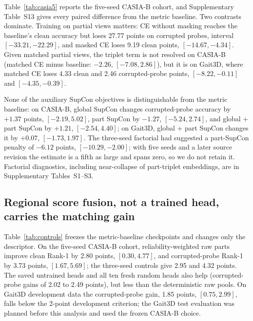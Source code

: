 \documentclass[journal]{IEEEtran}
\newcommand{\tablesetup}{\footnotesize\setlength{\tabcolsep}{4pt}}
\begin{document}
Table~\ref{tab:casia5} reports the five-seed CASIA-B cohort, and
Supplementary Table~S13 gives every paired difference from the metric baseline. Two
contrasts dominate. Training on partial views matters: CE without masking
reaches the baseline's clean accuracy but loses 27.77 points on corrupted
probes, interval $[-33.21,-22.29]$, and masked CE loses 9.19 clean points,
$[-14.67,-4.34]$. Given matched partial views, the triplet term is not
resolved on CASIA-B (matched CE minus baseline: $-2.26$, $[-7.08,2.86]$), but it
is on Gait3D, where matched CE loses 4.33 clean and 2.46 corrupted-probe points,
$[-8.22,-0.11]$ and $[-4.35,-0.39]$.

None of the auxiliary SupCon objectives is distinguishable from the metric
baseline: on CASIA-B, global SupCon changes corrupted-probe accuracy by $+1.37$
points, $[-2.19,5.02]$, part SupCon by $-1.27$, $[-5.24,2.74]$, and global + part
SupCon by $+1.21$, $[-2.54,4.40]$; on Gait3D, global + part SupCon changes it by
$+0.07$, $[-1.73,1.97]$. The three-seed factorial had suggested a part-SupCon
penalty of $-6.12$ points, $[-10.29,-2.00]$; with five seeds and a later source
revision the estimate is a fifth as large and spans zero, so we do not retain it.
Factorial diagnostics, including near-collapse of part-triplet embeddings, are
in Supplementary Tables~S1--S3.

\begin{table}[!t]
\centering
\caption{CASIA-B development Rank-1 (\%), five training seeds per objective,
12 held-out identities and 792 probes. Clean and corrupted-probe columns give
mean $\pm$ seed standard deviation. Corrupted columns average four families at
severities 0.1--0.7; single-view averages NM, BG and CL.}
\label{tab:casia5}
{\tablesetup
}
\end{table}

\subsection{Regional score fusion, not a trained head, carries the matching gain}

Table~\ref{tab:controls} freezes the metric-baseline checkpoints and changes only
the descriptor. On the five-seed CASIA-B cohort, reliability-weighted raw parts
improve clean Rank-1 by 2.80 points, $[0.30,4.77]$, and corrupted-probe Rank-1
by 3.73 points, $[1.67,5.69]$; the three-seed controls give 2.95 and 4.32
points. The saved untrained heads and all ten fresh random heads also help
(corrupted-probe gains of 2.02 to 2.49 points), but less than the deterministic
raw pools. On Gait3D development data the corrupted-probe gain, 1.85 points,
$[0.75,2.99]$, falls below the 2-point development criterion; the Gait3D test
evaluation was planned before this analysis and used the frozen CASIA-B
choice.
\end{document}
